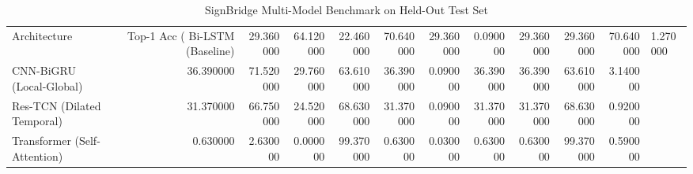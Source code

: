 \begin{table}
\caption{SignBridge Multi-Model Benchmark on Held-Out Test Set}
\label{tab:signbridge_benchmark}
\begin{tabular}{lrrrrrrrrrr}
\toprule
Architecture & Top-1 Acc (%
\midrule
Bi-LSTM (Baseline) & 29.360000 & 64.120000 & 22.460000 & 70.640000 & 29.360000 & 0.090000 & 29.360000 & 29.360000 & 70.640000 & 1.270000 \\
CNN-BiGRU (Local-Global) & 36.390000 & 71.520000 & 29.760000 & 63.610000 & 36.390000 & 0.090000 & 36.390000 & 36.390000 & 63.610000 & 3.140000 \\
Res-TCN (Dilated Temporal) & 31.370000 & 66.750000 & 24.520000 & 68.630000 & 31.370000 & 0.090000 & 31.370000 & 31.370000 & 68.630000 & 0.920000 \\
Transformer (Self-Attention) & 0.630000 & 2.630000 & 0.000000 & 99.370000 & 0.630000 & 0.030000 & 0.630000 & 0.630000 & 99.370000 & 0.590000 \\
\bottomrule
\end{tabular}
\end{table}
